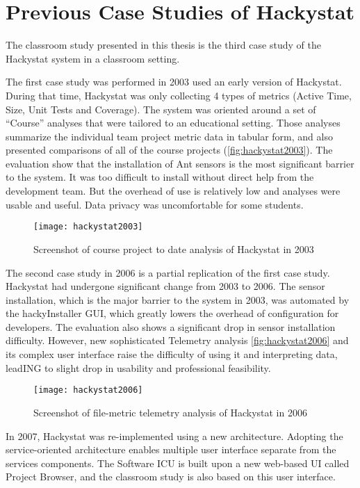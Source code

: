 \section {Previous Case Studies of Hackystat}
The classroom study presented in this thesis is the third case study of the Hackystat system in a classroom setting. 

The first case study was performed in 2003 used an early version of Hackystat\cite{csdl2-03-13}. During that time, Hackystat was only collecting 4 types of metrics (Active Time, Size, Unit Tests and Coverage). The system was oriented around a set of ``Course'' analyses that were tailored to an educational setting. Those analyses summarize the individual team project metric data in tabular form, and also presented comparisons of all of the course projects (\autoref{fig:hackystat2003}). The evaluation show that the installation of Ant sensors is the most significant barrier to the system. It was too difficult to install without direct help from the development team. But the overhead of use is relatively low and analyses were usable and useful. Data privacy was uncomfortable for some students.

\begin{figure}[htbp]
   \centering
   \texttt{[image: hackystat2003]} 
   \caption{Screenshot of course project to date analysis of Hackystat in 2003}
   \label{fig:hackystat2003}
\end{figure}

The second case study in 2006 is a partial replication of the first case study\cite{csdl2-07-02}. Hackystat had undergone significant change from 2003 to 2006. The sensor installation, which is the major barrier to the system in 2003, was automated by the hackyInstaller GUI, which greatly lowers the overhead of configuration for developers. The evaluation also shows a significant drop in sensor installation difficulty. However, new sophisticated Telemetry analysis \autoref{fig:hackystat2006} and its complex user interface raise the difficulty of using it and interpreting data, leadING to slight drop in usability and professional feasibility.

\begin{figure}[htbp]
   \centering
   \texttt{[image: hackystat2006]} 
   \caption{Screenshot of file-metric telemetry analysis of Hackystat in 2006}
   \label{fig:hackystat2006}
\end{figure}

In 2007, Hackystat was re-implemented using a new architecture. Adopting the service-oriented architecture enables multiple user interface separate from the services components. The Software ICU is built upon a new web-based UI called Project Browser, and the classroom study is also based on this user interface.


